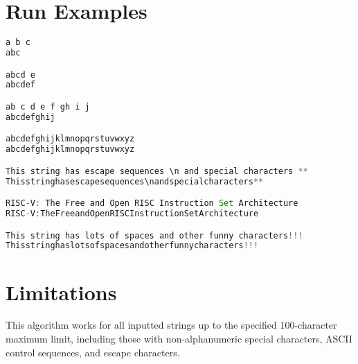 \documentclass{article}
\begin{document}
\hfill \break
\section{Run Examples}
\begin{lstlisting}[language=Java]
a b c
abc

abcd e
abcdef

ab c d e f gh i j
abcdefghij

abcdefghijklmnopqrstuvwxyz
abcdefghijklmnopqrstuvwxyz

This string has escape sequences \n and special characters **
Thisstringhasescapesequences\nandspecialcharacters**

RISC-V: The Free and Open RISC Instruction Set Architecture
RISC-V:TheFreeandOpenRISCInstructionSetArchitecture

This string has lots of spaces and other funny characters!!!
Thisstringhaslotsofspacesandotherfunnycharacters!!!
\end{lstlisting}

\section{Limitations}
This algorithm works for all inputted strings up to the specified 100-character maximum limit, including those with non-alphanumeric special characters, ASCII control sequences, and escape characters.
\end{document}
